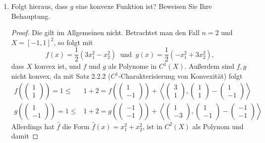 \documentclass[12pt]{extreport} %
\begin{document}
\begin{enumerate}
	\item Folgt hieraus, dass $g$ eine konvexe Funktion ist? Beweisen Sie Ihre Behauptung.
		\begin{proof}
			Die gilt im Allgemeinen nicht. Betrachtet man den Fall $n = 2$ und $X = [-1, 1]^2$, so folgt mit 
			$$ f(x) = \frac{1}{2} \left( 3 x_1^2 -  x_2^2 \right) ~ \text{ und } ~ g(x) = \frac{1}{2} \left( -x_1^2 + 3 x_2^2 \right), $$
			dass $X$ konvex ist, und $f$ und $g$ als Polynome in $C^1(X)$. Außerdem sind $f, g$ nicht konvex, da mit Satz 2.2.2 ($C^1$-Charakterisierung von Konvexität) folgt
			\begin{align*}
				f \left(\begin{pmatrix} 1 \\ 1 \end{pmatrix} \right) = 1 \leq & 1 + 2 = f \left(\begin{pmatrix} 1 \\ -1 \end{pmatrix} \right) + \left\langle \begin{pmatrix} 3 \\ 1 \end{pmatrix} ,  \begin{pmatrix} 1 \\ 1 \end{pmatrix} -  \begin{pmatrix} 1 \\ -1 \end{pmatrix} \right\rangle \\
				g \left(\begin{pmatrix} 1 \\ -1 \end{pmatrix} \right) = 1 \leq & 1 + 2 = g \left(\begin{pmatrix} -1 \\ -1 \end{pmatrix} \right) + \left\langle \begin{pmatrix} 1 \\ -3 \end{pmatrix} ,  \begin{pmatrix} 1 \\ -1 \end{pmatrix} -  \begin{pmatrix} -1 \\ -1 \end{pmatrix} \right\rangle \
			\end{align*} 
			Allerdings hat $\hat{f}$ die Form $\hat{f}(x) = x_1^2 + x_2^2$, ist in $C^2(X)$ als Polynom und damit

\end{proof}
\end{enumerate}
\end{document}
